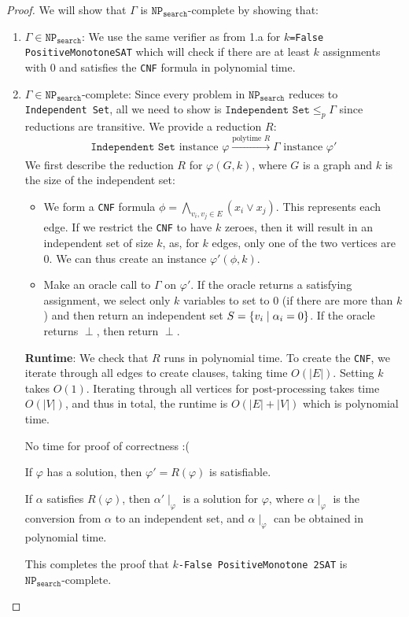 \documentclass[11pt]{scrartcl}
\theoremstyle{dotlessP}
\theoremstyle{dotlessN}
\DeclarePairedDelimiter\set{\{}{\}}
\newcommand{\np}{\texttt{NP}_\texttt{search}}
\newcommand{\npc}{\texttt{NP}_\texttt{search}\text{-complete}}
\begin{document}
\begin{enumerate}[(a)]
\begin{proof}
			We will show that $\Gamma$ is $\npc$ by showing that:
			\begin{enumerate}[1.]
				\item $\Gamma \in \np$: We use the same verifier as from 1.a for \texttt{$k$=False PositiveMonotoneSAT} which will check if there are at least $k$ assignments with 0 and satisfies the \texttt{CNF} formula in polynomial time.
				\item $\Gamma \in \npc$: Since every problem in $\np$ reduces to \texttt{Independent Set}, all we need to show is $\texttt{Independent Set} \leq_p \Gamma$ since reductions are transitive. We provide a reduction $R$:
					\[
						\texttt{Independent Set} \text{ instance } \varphi \xrightarrow[]{\text{polytime } R} \Gamma \text{ instance } \varphi'
					\] 
					We first describe the reduction $R$ for $\varphi(G,k)$, where $G$ is a graph and $k$ is the size of the independent set:
					\begin{itemize}
						\item We form a \texttt{CNF} formula $\phi = \displaystyle\bigwedge_{v_i, v_j \in E} (x_i \lor x_j)$. This represents each edge. If we restrict the \texttt{CNF} to have $k$ zeroes, then it will result in  an independent set of size $k$, as, for $k$ edges, only one of the two vertices are 0. We can thus create an instance $\varphi'(\phi, k)$.
						\item Make an oracle call to $\Gamma$ on $\varphi'$. If the oracle returns a satisfying assignment, we select only $k$ variables to set to 0 (if there are more than $k$) and then return an independent set $S = \set*{v_i \mid \alpha_i = 0}$. If the oracle returns $\perp$, then return $\perp$.
					\end{itemize}
					\textbf{Runtime}: We check that $R$ runs in polynomial time. To create the \texttt{CNF}, we iterate through all edges to create clauses, taking time $O(|E|)$. Setting $k$ takes $O(1)$. Iterating through all vertices for post-processing takes time $O(|V|)$, and thus in total, the runtime is $O(|E| + |V|)$ which is polynomial time.
					\begin{remark*}
					No time for proof of correctness :(		
					\end{remark*}
					\begin{claim*}
						If $\varphi$ has a solution, then $\varphi' = R(\varphi)$ is satisfiable.
					\end{claim*}
					\begin{claim*}
						If $\alpha$ satisfies $R(\varphi)$, then $\alpha' \mid_\varphi$ is a solution for $\varphi$, where $\alpha \mid_\varphi$ is the conversion from $\alpha$ to an independent set, and $\alpha \mid_\varphi$ can be obtained in polynomial time.
					\end{claim*}
					This completes the proof that \texttt{$k$-False PositiveMonotone 2SAT} is $\npc$.
			\end{enumerate}
		\end{proof}
\end{enumerate}
\end{document}
